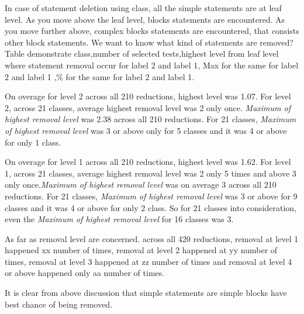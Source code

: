 
In case of statement deletion using class, all the simple statements are at leaf level. As you move above the leaf level, blocks statements are encountered. As you move further above, complex blocks statements are encountered, that consists other block statements. We want to know what kind of statements are removed?
Table demonstrate class,number of selected tests,highest level from leaf level where statement removal occur for label 2 and label 1,  Max for the same for  label 2 and label 1 ,\%  for the same for label 2 and label 1.

On overage for level 2 across all 210 reductions, highest level was 1.07. For level 2, across 21 classes, average highest removal level was 2 only once. \emph{Maximum of highest removal level}  was 2.38 across all 210 reductions. For 21 classes, \emph{Maximum of highest removal level}  was 3 or above only for 5 classes and it was 4 or above for only 1 class.

On overage for level 1 across all 210 reductions, highest level was 1.62. For level 1, across 21 classes, average highest removal level was 2 only 5 times and above 3 only once.\emph{Maximum of highest removal level}   was on average 3 across all 210 reductions. For 21 classes, \emph{Maximum of highest removal level} was 3 or above for 9 classes and it was 4 or above for only 2 class. So for 21 classes into consideration, even the \emph{Maximum of highest removal level} for 16 classes was 3. 

As far as removal level are concerned. across all 420 reductions, removal at level 1 happened xx number of times, removal at level 2 happened at yy number of times, removal at level 3 happened at zz number of times and removal at level 4 or above happened only aa number of times. 

It is clear from above discussion that simple statements are simple blocks have best chance of being removed. 

   
   

